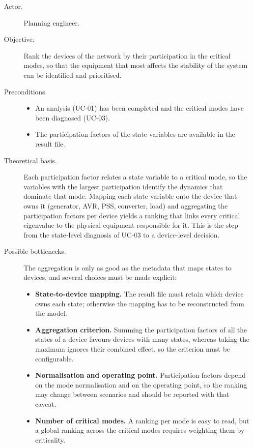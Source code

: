 \begin{description}
  \item[Actor.] Planning engineer.
  \item[Objective.] Rank the devices of the network by their participation in the critical modes, so that the equipment that most affects the stability of the system can be identified and prioritised.
  \item[Preconditions.]
        \begin{itemize}[before=\leavevmode, leftmargin=*]
          \item An analysis (UC-01) has been completed and the critical modes have been diagnosed (UC-03).
          \item The participation factors of the state variables are available in the result file.
        \end{itemize}
  \item[Theoretical basis.] Each participation factor relates a state variable to a critical mode, so the variables with the largest participation identify the dynamics that dominate that mode. Mapping each state variable onto the device that owns it (generator, AVR, PSS, converter, load) and aggregating the participation factors per device yields a ranking that links every critical eigenvalue to the physical equipment responsible for it. This is the step from the state-level diagnosis of UC-03 to a device-level decision.
  \item[Possible bottlenecks.] The aggregation is only as good as the metadata that maps states to devices, and several choices must be made explicit:
        \begin{itemize}[before=\leavevmode, leftmargin=*]
          \item \textbf{State-to-device mapping.} The result file must retain which device owns each state; otherwise the mapping has to be reconstructed from the model.
          \item \textbf{Aggregation criterion.} Summing the participation factors of all the states of a device favours devices with many states, whereas taking the maximum ignores their combined effect, so the criterion must be configurable.
          \item \textbf{Normalisation and operating point.} Participation factors depend on the mode normalisation and on the operating point, so the ranking may change between scenarios and should be reported with that caveat.
          \item \textbf{Number of critical modes.} A ranking per mode is easy to read, but a global ranking across the critical modes requires weighting them by criticality.

\end{itemize}
\end{description}

